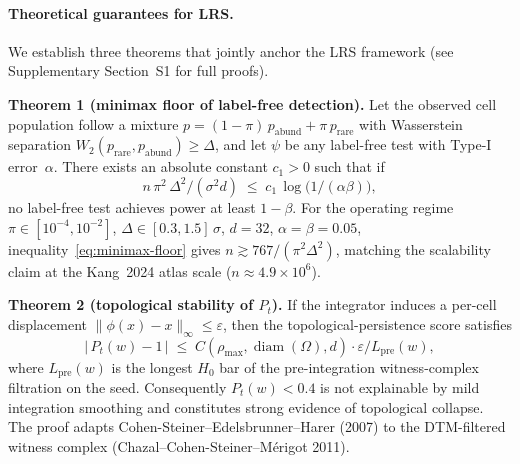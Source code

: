 

\paragraph{Theoretical guarantees for LRS.}
We establish three theorems that jointly anchor the LRS framework (see Supplementary Section~S1 for full proofs).

\textbf{Theorem 1 (minimax floor of label-free detection).}
Let the observed cell population follow a mixture $p = (1-\pi)\, p_{\text{abund}} + \pi\, p_{\text{rare}}$ with Wasserstein separation $W_2(p_{\text{rare}}, p_{\text{abund}}) \geq \Delta$, and let $\psi$ be any label-free test with Type-I error~$\alpha$. There exists an absolute constant $c_1 > 0$ such that if
\begin{equation}
  n\,\pi^{2}\,\Delta^{2}/(\sigma^{2} d)
  \;\leq\; c_{1}\,\log \bigl(1/(\alpha\beta)\bigr),
  \label{eq:minimax-floor}
\end{equation}
no label-free test achieves power at least $1-\beta$. For the operating regime $\pi\in[10^{-4},10^{-2}]$, $\Delta\in[0.3,1.5]\,\sigma$, $d=32$, $\alpha=\beta=0.05$, inequality~\eqref{eq:minimax-floor} gives $n \gtrsim 767/(\pi^{2}\Delta^{2})$, matching the scalability claim at the Kang~2024 atlas scale ($n\approx 4.9\times 10^{6}$).

\textbf{Theorem 2 (topological stability of $P_t$).}
If the integrator induces a per-cell displacement $\|\phi(x)-x\|_{\infty}\leq \varepsilon$, then the topological-persistence score satisfies
\begin{equation}
  \bigl|\,P_t(w)-1\,\bigr| \;\leq\; C(\rho_{\max},\operatorname{diam}(\Omega),d)\cdot \varepsilon / L_{\text{pre}}(w),
\end{equation}
where $L_{\text{pre}}(w)$ is the longest $H_0$ bar of the pre-integration witness-complex filtration on the seed. Consequently $P_t(w)<0.4$ is not explainable by mild integration smoothing and constitutes strong evidence of topological collapse. The proof adapts Cohen-Steiner--Edelsbrunner--Harer (2007) to the DTM-filtered witness complex (Chazal--Cohen-Steiner--M\'erigot 2011).


